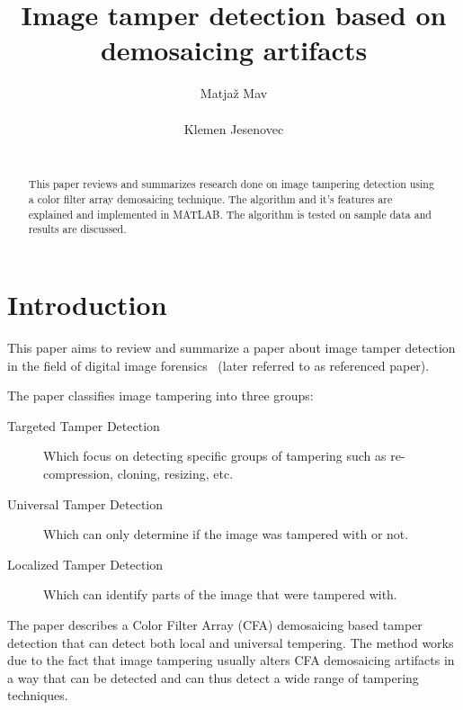 \documentclass{template/acm_proc_article-sp}
\begin{document}
 

\title{Image tamper detection based on demosaicing artifacts}

\author{
\alignauthor
Matjaž Mav\\
       \\
\alignauthor
Klemen Jesenovec\\
       \\
}

\maketitle
\begin{abstract}
This paper reviews and summarizes research done on image tampering detection
using a color filter array demosaicing technique. The algorithm and it's features are
explained and implemented in MATLAB. The algorithm is tested on sample data and results
are discussed.
\end{abstract}


\section{Introduction}
This paper aims to review and summarize a paper about image tamper 
detection in the field of digital image forensics~\cite{dirik2009image} (later referred to as referenced paper).

The paper classifies image tampering into three groups: 
\begin{description}
    \item[Targeted Tamper Detection] Which focus on detecting specific groups of 
    tampering such as re-compression, cloning, resizing, etc. 
    \item[Universal Tamper Detection] Which can only determine if the image
    was tampered with or not.
    \item[Localized Tamper Detection] Which can identify parts of the image 
    that were tampered with.
\end{description}

The paper describes a Color Filter Array (CFA) demosaicing based tamper detection
that can detect both local and universal tempering.
The method works due to the fact that image tampering usually alters CFA demosaicing
artifacts in a way that can be detected and can thus detect a wide range of tampering
techniques. 
\end{document}
